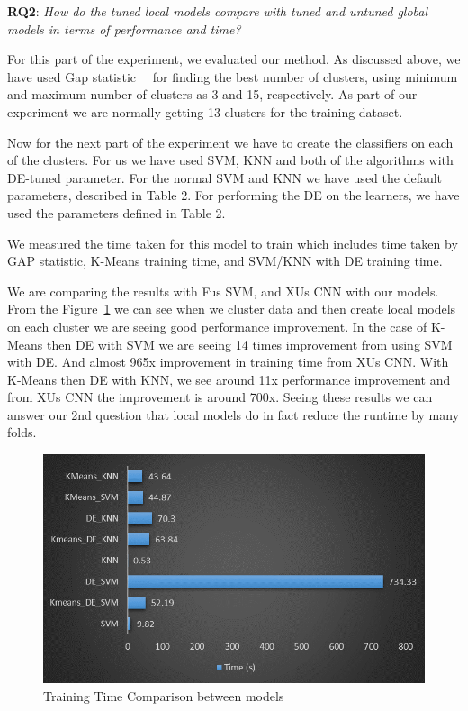 \documentclass[sigconf]{acmart}
\theoremstyle{break}
\begin{document}
    \textbf{RQ2}: {\em   How do the tuned local models compare with tuned and untuned global models in terms of performance and time?}
    
    For this part of the experiment, we evaluated our method. As discussed above, we have used Gap statistic~\cite{mohajer2011comparison}~\cite{tibshirani2001estimating} for finding the best number of clusters, using minimum and maximum number of clusters as 3 and 15, respectively. As part of our experiment we are normally getting 13 clusters for the training dataset. 
    
    Now for the next part of the experiment we have to create the classifiers on each of the clusters. For us we have used SVM, KNN and both of the algorithms with DE-tuned parameter. For the normal SVM and KNN we have used the default parameters, described in Table 2. For performing the DE on the learners, we have used the parameters defined in Table 2. 
    
    We measured the time taken for this model to train which includes time taken by GAP statistic, K-Means training time, and SVM/KNN with DE training time.
    
    We are comparing the results with Fu\textquotesingle s SVM, and XU\textquotesingle s CNN with our models. From the Figure~\ref{fig:time} we can see when we cluster data and then create local models on each cluster we are seeing good performance improvement. In the case of K-Means then DE with SVM we are seeing 14 times improvement from using SVM with DE. And almost 965x improvement in training time from XU\textquotesingle s CNN. With K-Means then DE with KNN, we see around 11x performance improvement and from XU\textquotesingle s CNN the improvement is around 700x. Seeing these results we can answer our 2nd question that local models do in fact reduce the runtime by many folds.
    
    \begin{figure}
        \centering
        \includegraphics[width=\linewidth]{fig/Time.png}
        \caption{Training Time Comparison between models}
        \label{fig:time}
    \end{figure}
    
\end{document}
